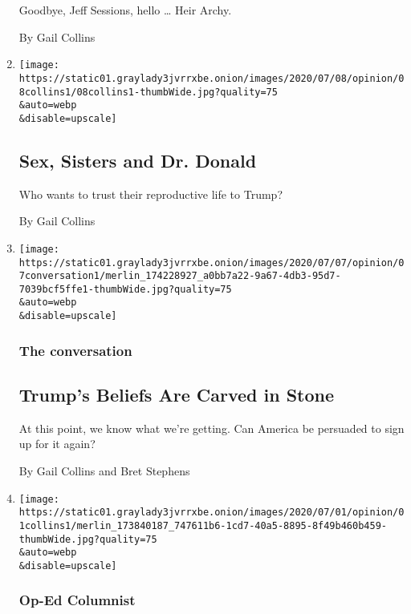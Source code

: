 \begin{enumerate}
  Goodbye, Jeff Sessions, hello \ldots{} Heir Archy.

  By Gail Collins
\item
  \href{/2020/07/08/opinion/birth-control-supreme-court.html}{}

  \texttt{[image: https://static01.graylady3jvrrxbe.onion/images/2020/07/08/opinion/08collins1/08collins1-thumbWide.jpg?quality=75\\\&auto=webp\\\&disable=upscale]}

  \hypertarget{sex-sisters-and-dr-donald}{%
  \subsection{Sex, Sisters and Dr.
  Donald}\label{sex-sisters-and-dr-donald}}

  Who wants to trust their reproductive life to Trump?

  By Gail Collins
\item
  \href{/2020/07/07/opinion/trump-coronavirus-mount-rushmore.html}{}

  \texttt{[image: https://static01.graylady3jvrrxbe.onion/images/2020/07/07/opinion/07conversation1/merlin\_174228927\_a0bb7a22-9a67-4db3-95d7-7039bcf5ffe1-thumbWide.jpg?quality=75\\\&auto=webp\\\&disable=upscale]}

  \hypertarget{the-conversation-3}{%
  \subsubsection{The conversation}\label{the-conversation-3}}

  \hypertarget{trumps-beliefs-are-carved-in-stone}{%
  \subsection{Trump's Beliefs Are Carved in
  Stone}\label{trumps-beliefs-are-carved-in-stone}}

  At this point, we know what we're getting. Can America be persuaded to
  sign up for it again?

  By Gail Collins and Bret Stephens
\item
  \href{/interactive/2020/07/01/opinion/4th-of-july-quiz.html}{}

  \texttt{[image: https://static01.graylady3jvrrxbe.onion/images/2020/07/01/opinion/01collins1/merlin\_173840187\_747611b6-1cd7-40a5-8895-8f49b460b459-thumbWide.jpg?quality=75\\\&auto=webp\\\&disable=upscale]}

  \hypertarget{op-ed-columnist}{%
  \subsubsection{Op-Ed Columnist}\label{op-ed-columnist}}


\end{enumerate}

